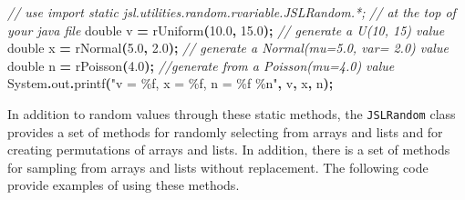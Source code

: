 \documentclass[
]{book}
\newenvironment{Shaded}{\begin{snugshade}}{\end{snugshade}}
\newcommand{\BuiltInTok}[1]{#1}
\newcommand{\CommentTok}[1]{\textcolor[rgb]{0.56,0.35,0.01}{\textit{#1}}}
\newcommand{\DataTypeTok}[1]{\textcolor[rgb]{0.13,0.29,0.53}{#1}}
\newcommand{\FloatTok}[1]{\textcolor[rgb]{0.00,0.00,0.81}{#1}}
\newcommand{\FunctionTok}[1]{\textcolor[rgb]{0.00,0.00,0.00}{#1}}
\newcommand{\NormalTok}[1]{#1}
\newcommand{\OperatorTok}[1]{\textcolor[rgb]{0.81,0.36,0.00}{\textbf{#1}}}
\newcommand{\SpecialCharTok}[1]{\textcolor[rgb]{0.00,0.00,0.00}{#1}}
\newcommand{\StringTok}[1]{\textcolor[rgb]{0.31,0.60,0.02}{#1}}
\theoremstyle{definition}
\theoremstyle{definition}
\theoremstyle{definition}
\theoremstyle{definition}
\theoremstyle{remark}
\begin{document}
\begin{Shaded}
\begin{Highlighting}[]
\CommentTok{// use import static jsl.utilities.random.rvariable.JSLRandom.*;}
\CommentTok{// at the top of your java file}
\DataTypeTok{double}\NormalTok{ v }\OperatorTok{=} \FunctionTok{rUniform}\OperatorTok{(}\FloatTok{10.0}\OperatorTok{,} \FloatTok{15.0}\OperatorTok{);} \CommentTok{// generate a U(10, 15) value}
\DataTypeTok{double}\NormalTok{ x }\OperatorTok{=} \FunctionTok{rNormal}\OperatorTok{(}\FloatTok{5.0}\OperatorTok{,} \FloatTok{2.0}\OperatorTok{);} \CommentTok{// generate a Normal(mu=5.0, var= 2.0) value}
\DataTypeTok{double}\NormalTok{ n }\OperatorTok{=} \FunctionTok{rPoisson}\OperatorTok{(}\FloatTok{4.0}\OperatorTok{);} \CommentTok{//generate from a Poisson(mu=4.0) value}
\BuiltInTok{System}\OperatorTok{.}\FunctionTok{out}\OperatorTok{.}\FunctionTok{printf}\OperatorTok{(}\StringTok{"v = }\SpecialCharTok{\%f}\StringTok{, x = }\SpecialCharTok{\%f}\StringTok{, n = }\SpecialCharTok{\%f}\StringTok{ }\SpecialCharTok{\%n}\StringTok{"}\OperatorTok{,}\NormalTok{ v}\OperatorTok{,}\NormalTok{ x}\OperatorTok{,}\NormalTok{ n}\OperatorTok{);}
\end{Highlighting}
\end{Shaded}

In addition to random values through these static methods, the
\texttt{JSLRandom} class provides a set of methods for randomly selecting from
arrays and lists and for creating permutations of arrays and lists. In
addition, there is a set of methods for sampling from arrays and lists
without replacement. The following code provide examples of using these methods.
\end{document}
